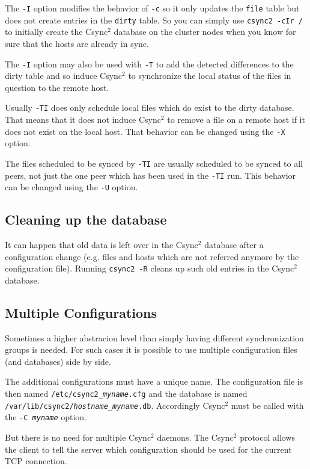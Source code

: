 \documentclass[a4paper,twocolumn]{article}
\def\csync2{{\sc Csync$^{2}$}}
\begin{document}
The {\tt -I} option modifies the behavior of {\tt -c} so it only updates the
{\tt file} table but does not create entries in the {\tt dirty} table. So you
can simply use {\tt csync2 -cIr /} to initially create the \csync2 database on
the cluster nodes when you know for sure that the hosts are already in sync.

The {\tt -I} option may also be used with {\tt -T} to add the detected
differences to the dirty table and so induce \csync2 to synchronize the local
status of the files in question to the remote host.

Usually {\tt -TI} does only schedule local files which do exist to the dirty
database. That means that it does not induce \csync2 to remove a file on a
remote host if it does not exist on the local host. That behavior can be
changed using the {\tt -X} option.

The files scheduled to be synced by {\tt -TI} are usually scheduled to be
synced to all peers, not just the one peer which has been used in the {\tt -TI}
run. This behavior can be changed using the {\tt -U} option.

\subsection{Cleaning up the database}

It can happen that old data is left over in the \csync2 database after a
configuration change (e.g. files and hosts which are not referred anymore
by the configuration file). Running {\tt csync2 -R} cleans up such old
entries in the \csync2 database.

\subsection{Multiple Configurations}

Sometimes a higher abstracion level than simply having different
synchronization groups is needed. For such cases it is possible to use multiple
configuration files (and databases) side by side.

The additional configurations must have a unique name. The configuration file
is then named {\tt /etc/csync2\_{\it myname}.cfg} and the database is named
{\tt /var/lib/csync2/{\it hostname}\_{\it myname}.db}. Accordingly \csync2 must
be called with the {\tt -C {\it myname}} option.

But there is no need for multiple \csync2 daemons. The \csync2 protocol allows
the client to tell the server which configuration should be used for the
current TCP connection.
\end{document}
